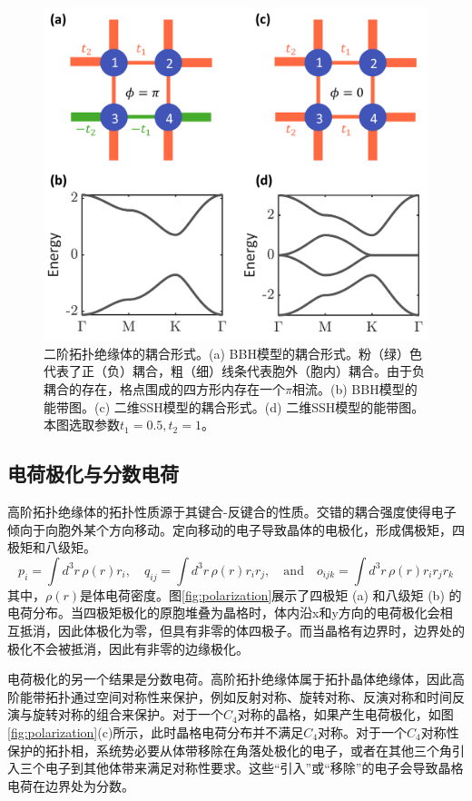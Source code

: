 \begin{figure}[tbp]
    \centering
    \includegraphics[width=0.5\linewidth]{figure/Introduction/HOTIBand.png}
    \caption{二阶拓扑绝缘体的耦合形式。(a) BBH模型的耦合形式。粉（绿）色代表了正（负）耦合，粗（细）线条代表胞外（胞内）耦合。由于负耦合的存在，格点围成的四方形内存在一个$\pi$相流。(b) BBH模型的能带图。(c) 二维SSH模型的耦合形式。(d) 二维SSH模型的能带图。本图选取参数$t_1=0.5, t_2=1$。}
    \label{fig:HOTIBand}
    
\end{figure}

\subsection{电荷极化与分数电荷}
高阶拓扑绝缘体的拓扑性质源于其键合-反键合的性质。交错的耦合强度使得电子倾向于向胞外某个方向移动。定向移动的电子导致晶体的电极化，形成偶极矩，四极矩和八级矩。
\begin{equation}
p_i = \int d^3r \, \rho(r) r_i, \quad 
q_{ij} = \int d^3r \, \rho(r) r_i r_j, \quad \text{and} \quad
o_{ijk} = \int d^3r \, \rho(r) r_i r_j r_k
\end{equation}
其中，$\rho(r)$是体电荷密度。图\ref{fig:polarization}展示了四极矩 (a) 和八级矩 (b) 的电荷分布。当四极矩极化的原胞堆叠为晶格时，体内沿x和y方向的电荷极化会相互抵消，因此体极化为零，但具有非零的体四极子。而当晶格有边界时，边界处的极化不会被抵消，因此有非零的边缘极化。

电荷极化的另一个结果是分数电荷\cite{benalcazar2019quantization}。高阶拓扑绝缘体属于拓扑晶体绝缘体\cite{xie2021higher,noh2018topological}，因此高阶能带拓扑通过空间对称性来保护，例如反射对称\cite{langbehn2017reflection}、旋转对称\cite{schindler2018higher}、反演对称\cite{khalaf2018higher}和时间反演与旋转对称的组合\cite{geier2018second}来保护。对于一个$C_4$对称的晶格，如果产生电荷极化，如图\ref{fig:polarization}(c)所示，此时晶格电荷分布并不满足$C_4$对称。对于一个$C_4$对称性保护的拓扑相，系统势必要从体带移除在角落处极化的电子，或者在其他三个角引入三个电子到其他体带来满足对称性要求。这些“引入”或“移除”的电子会导致晶格电荷在边界处为分数。

